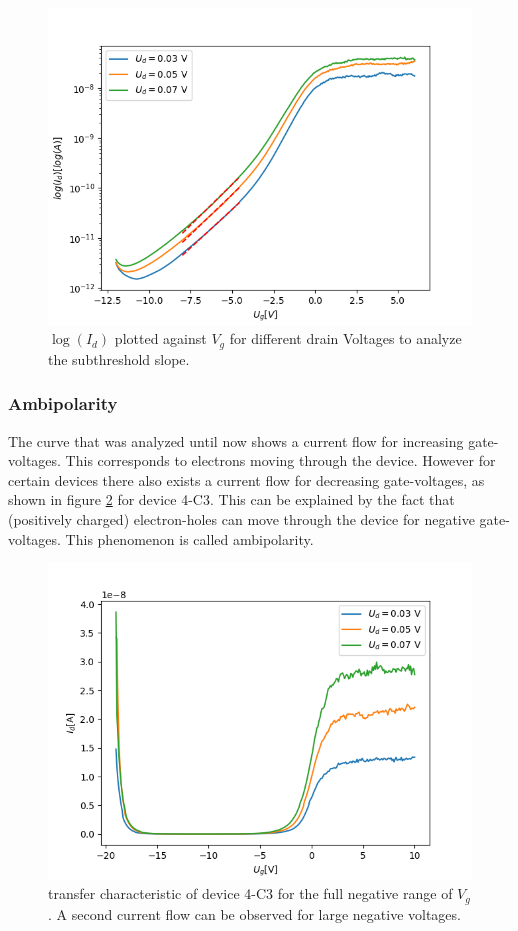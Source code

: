 \documentclass[%
 reprint,
amsmath,amssymb,
pra,
]{revtex4-1}
\begin{document}
\begin{figure}[h]
\centering
\includegraphics[scale=0.55]{Bilder/log.png}
\caption{$\log(I_d)$ plotted against $V_g$ for different drain Voltages to analyze the subthreshold slope.}
\label{fig:log}
\end{figure}



\subsubsection{Ambipolarity}
The curve that was analyzed until now shows a current flow for increasing gate-voltages. This corresponds to electrons moving through the device. However for certain devices there also exists a current flow for decreasing gate-voltages, as shown in figure \ref{fig:ambipol} for device 4-C3. This can be explained by the fact that (positively charged) electron-holes can move through the device for negative gate-voltages. This phenomenon is called ambipolarity.

\begin{figure}
\centering
\includegraphics[scale=0.6]{Bilder/amipol.png}
\caption{transfer characteristic of device 4-C3 for the full negative range of $V_g$. A second current flow can be observed for large negative voltages.}
\label{fig:ambipol}
\end{figure}
\end{document}
